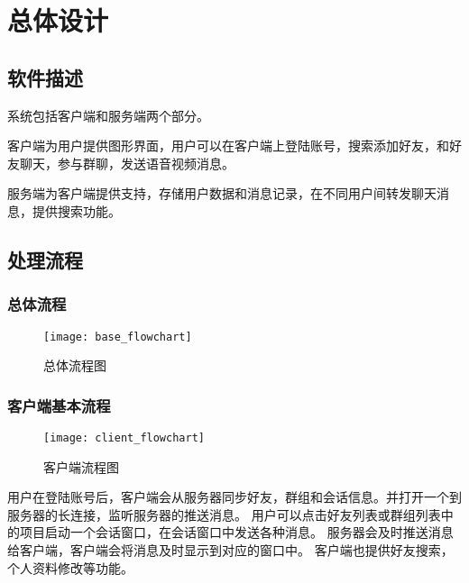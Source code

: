 \chapter{总体设计}
\section{软件描述}


系统包括客户端和服务端两个部分。

客户端为用户提供图形界面，用户可以在客户端上登陆账号，搜索添加好友，和好友聊天，参与群聊，发送语音视频消息。

服务端为客户端提供支持，存储用户数据和消息记录，在不同用户间转发聊天消息，提供搜索功能。

\section{处理流程}
\subsection{总体流程}

\begin{figure}[h]
	\centering
	\texttt{[image: base\_flowchart]}
	\caption{总体流程图} \label{fig:base_flowchart}
\end{figure}


\subsection{客户端基本流程}
\begin{figure}[h]
	\centering
	\texttt{[image: client\_flowchart]}
	\caption{客户端流程图} \label{fig:client_flowchart}
\end{figure}
用户在登陆账号后，客户端会从服务器同步好友，群组和会话信息。并打开一个到服务器的长连接，监听服务器的推送消息。
用户可以点击好友列表或群组列表中的项目启动一个会话窗口，在会话窗口中发送各种消息。
服务器会及时推送消息给客户端，客户端会将消息及时显示到对应的窗口中。
客户端也提供好友搜索，个人资料修改等功能。

